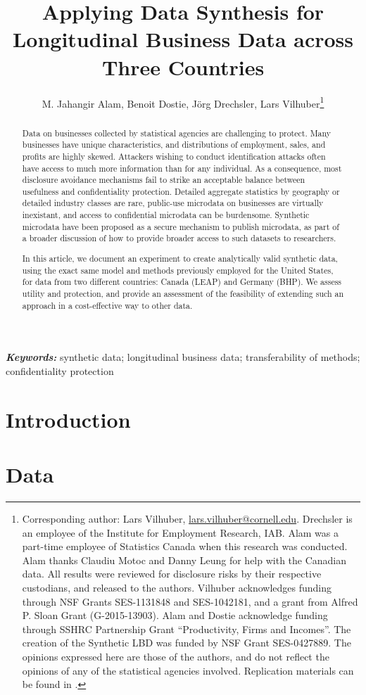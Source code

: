 \documentclass{article}
\title{Applying Data Synthesis for Longitudinal Business Data across Three Countries }
\author{M. Jahangir Alam, Benoit Dostie, J\"org Drechsler, Lars Vilhuber\thanks{Corresponding author: Lars Vilhuber, \href{mailto:lars.vilhuber@cornell.edu}{lars.vilhuber@cornell.edu}. Drechsler is an employee of the Institute for Employment Research, IAB. Alam was a part-time employee of Statistics Canada when this research was conducted.  Alam thanks Claudiu Motoc and Danny Leung for help with the Canadian data. All results were reviewed for disclosure risks by their respective custodians, and released to the authors. Vilhuber acknowledges funding through NSF Grants SES-1131848 and SES-1042181, and a grant from Alfred P. Sloan Grant (G-2015-13903). Alam and Dostie acknowledge funding through SSHRC Partnership Grant ``Productivity, Firms and Incomes''. The creation of the Synthetic LBD  was funded by NSF Grant SES-0427889. The opinions expressed here are those of the authors, and do not reflect the opinions of any of the statistical agencies involved. Replication materials can be found in \citet{SIT-paper-repo}.}}
\begin{document}
\maketitle
{}
\begin{abstract}
\noindent
Data on businesses collected by statistical agencies are challenging to protect. Many businesses have unique characteristics, and distributions of employment, sales, and profits are highly skewed. Attackers wishing to conduct identification attacks often have access to much more information than for any individual. As a consequence, most disclosure avoidance mechanisms  fail to strike an acceptable balance between usefulness and confidentiality protection. Detailed aggregate statistics by geography or detailed industry classes  are rare, public-use microdata on businesses are virtually inexistant, and access to confidential microdata can be burdensome. 
Synthetic microdata have been proposed as a secure mechanism to publish microdata, as part of a broader discussion of how  to provide broader access to such datasets to researchers.

In this article, we document an experiment to create analytically valid synthetic data, using the exact same model and methods previously employed for the United States, for data from two different countries: Canada (\ac{LEAP}) and Germany (\ac{BHP}). We assess utility and protection, and provide an assessment of the feasibility of extending such an approach in a cost-effective way to other data.

\end{abstract}
\vspace*{0.5cm}
\textbf{\textit{Keywords:}} synthetic data; longitudinal business data; transferability of methods; confidentiality protection

\newpage
\acresetall
\section{Introduction}


\section{Data} 
\label{sec:data}


%
\end{document}
